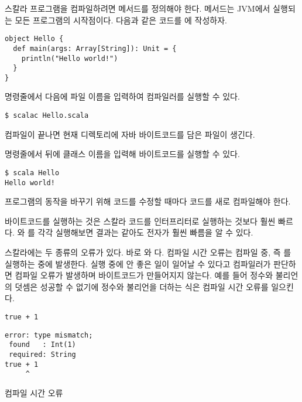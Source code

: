 스칼라 프로그램을 컴파일하려면  메서드를 정의해야 한다.  메서드는
JVM에서 실행되는 모든 프로그램의 시작점이다. 다음과 같은 코드를
에 작성하자.

\begin{verbatim}
object Hello {
  def main(args: Array[String]): Unit = {
    println("Hello world!")
  }
}
\end{verbatim}

명령줄에서  다음에 파일 이름을 입력하여 컴파일러를 실행할 수 있다.

\begin{verbatim}
$ scalac Hello.scala
\end{verbatim}

컴파일이 끝나면 현재 디렉토리에 자바 바이트코드를 담은  파일이
생긴다.

명령줄에서  뒤에 클래스 이름을 입력해 바이트코드를 실행할 수 있다.

\begin{verbatim}
$ scala Hello
Hello world!
\end{verbatim}

프로그램의 동작을 바꾸기 위해 코드를 수정할 때마다 코드를 새로 컴파일해야 한다.

바이트코드를 실행하는 것은 스칼라 코드를 인터프리터로 실행하는 것보다 훨씬
빠르다. 와 를 각각 실행해보면 결과는 같아도 전자가
훨씬 빠름을 알 수 있다.

스칼라에는 두 종류의 오류가 있다. 바로 와
다. 컴파일 시간 오류는 컴파일 중, 즉 를
실행하는 중에 발생한다. 실행 중에 안 좋은 일이 일어날 수 있다고 컴파일러가
판단하면 컴파일 오류가 발생하며 바이트코드가 만들어지지 않는다. 예를 들어 정수와
불리언의 덧셈은 성공할 수 없기에 정수와 불리언을 더하는 식은 컴파일 시간 오류를
일으킨다.

\begin{verbatim}
true + 1
\end{verbatim}
\vspace{-1em}
\begin{mdframed}[hidealllines=true,backgroundcolor=gray!10,innerleftmargin=3pt,innerrightmargin=3pt,leftmargin=-3pt,rightmargin=-3pt]
\begin{verbatim}
error: type mismatch;
 found   : Int(1)
 required: String
true + 1
     ^
\end{verbatim}
\vspace{-2em}
\begin{flushright}
\scriptsize\textsf{컴파일 시간 오류}
\end{flushright}
\end{mdframed}

